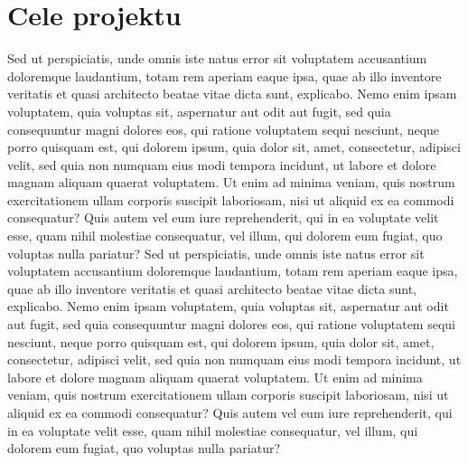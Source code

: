 \documentclass{mgr}
\begin{document}
\section{Cele projektu}
Sed ut perspiciatis, unde omnis iste natus error sit voluptatem accusantium doloremque laudantium, totam rem aperiam eaque ipsa, quae ab illo inventore veritatis et quasi architecto beatae vitae dicta sunt, explicabo. Nemo enim ipsam voluptatem, quia voluptas sit, aspernatur aut odit aut fugit, sed quia consequuntur magni dolores eos, qui ratione voluptatem sequi nesciunt, neque porro quisquam est, qui dolorem ipsum, quia dolor sit, amet, consectetur, adipisci velit, sed quia non numquam eius modi tempora incidunt, ut labore et dolore magnam aliquam quaerat voluptatem. Ut enim ad minima veniam, quis nostrum exercitationem ullam corporis suscipit laboriosam, nisi ut aliquid ex ea commodi consequatur? Quis autem vel eum iure reprehenderit, qui in ea voluptate velit esse, quam nihil molestiae consequatur, vel illum, qui dolorem eum fugiat, quo voluptas nulla pariatur?
Sed ut perspiciatis, unde omnis iste natus error sit voluptatem accusantium doloremque laudantium, totam rem aperiam eaque ipsa, quae ab illo inventore veritatis et quasi architecto beatae vitae dicta sunt, explicabo. Nemo enim ipsam voluptatem, quia voluptas sit, aspernatur aut odit aut fugit, sed quia consequuntur magni dolores eos, qui ratione voluptatem sequi nesciunt, neque porro quisquam est, qui dolorem ipsum, quia dolor sit, amet, consectetur, adipisci velit, sed quia non numquam eius modi tempora incidunt, ut labore et dolore magnam aliquam quaerat voluptatem. Ut enim ad minima veniam, quis nostrum exercitationem ullam corporis suscipit laboriosam, nisi ut aliquid ex ea commodi consequatur? Quis autem vel eum iure reprehenderit, qui in ea voluptate velit esse, quam nihil molestiae consequatur, vel illum, qui dolorem eum fugiat, quo voluptas nulla pariatur?
\end{document}
